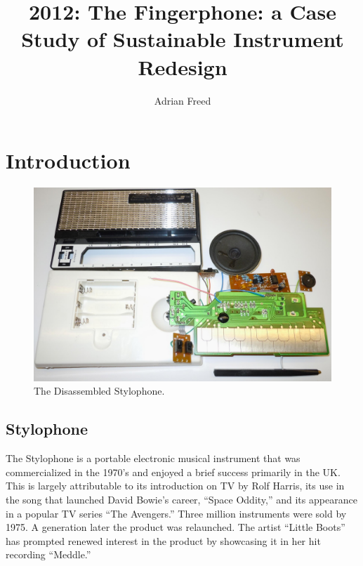 \graphicspath{  {mainmatter/Freed_2012/} }

\title*{2012: The Fingerphone: a Case Study of Sustainable Instrument Redesign}
\author{Adrian Freed}

%
%
\maketitle


\section{Introduction}


\begin{figure}[t]
\centering
\includegraphics[width=\textwidth]{fig1.jpg}
\caption{The Disassembled Stylophone.}
\label{Freed:img-1}
\end{figure}



\subsection{Stylophone}

The Stylophone is a portable electronic musical instrument that was commercialized in the 1970's and enjoyed a brief success primarily in the UK. This is largely attributable to its introduction on TV by Rolf Harris, its use in the song that launched David Bowie's career, ``Space Oddity,'' and its appearance in a popular TV series ``The Avengers.'' Three million instruments were sold by 1975. A generation later the product was relaunched. The artist ``Little Boots'' has prompted renewed interest in the product by showcasing it in her hit recording ``Meddle.''

